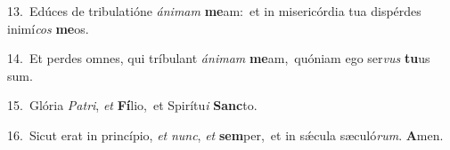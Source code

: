 {\numbfont\textcolor{\numbcolor}{13.}}~Edúces de tribulatióne \textit{á}\-\textit{ni}\textit{mam} \textbf{me}\-am:~\star et in misericórdia tua dispérdes inimí\textit{cos} \textbf{me}\-os.\par
{\numbfont\textcolor{\numbcolor}{14.}}~Et perdes omnes, qui tríbulant \textit{á}\-\textit{ni}\textit{mam} \textbf{me}\-am,~\star quóniam ego ser\textit{vus} \textbf{tu}\-us sum.\par
{\numbfont\textcolor{\numbcolor}{15.}}~Glória \textit{Pa}\-\textit{tri}, \textit{et} \textbf{Fí}\-lio,~\star et Spirítu\textit{i} \textbf{Sanc}\-to.\par
{\numbfont\textcolor{\numbcolor}{16.}}~Sicut erat in princípio, \textit{et} \textit{nunc}\-, \textit{et} \textbf{sem}\-per,~\star et in sǽcula sæculó\-\textit{rum}\-. \textbf{A}\-men.\par
